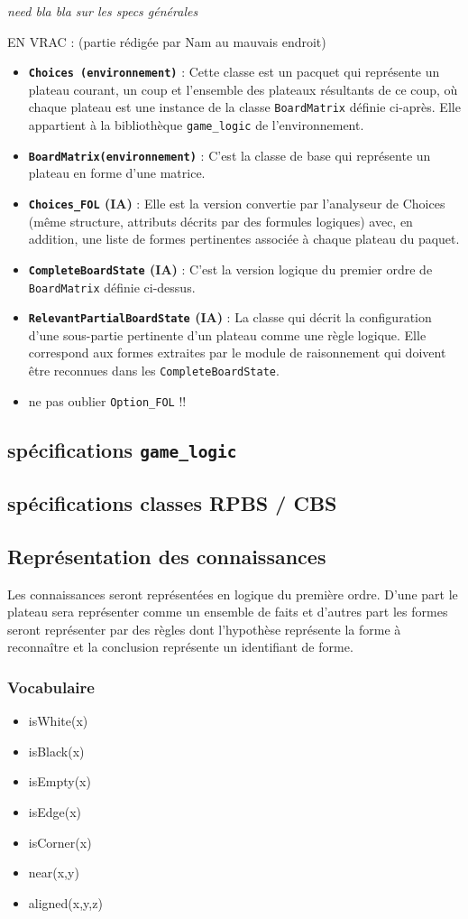 \emph{need bla bla sur les specs générales}

EN VRAC :
(partie rédigée par Nam au mauvais endroit)

\begin{itemize}
  \item \textbf {\texttt{\gls{Choices} (environnement)}} : Cette classe est un pacquet qui représente un plateau courant, un coup et l'ensemble des plateaux résultants de ce coup, où chaque plateau est une instance de la classe \texttt{\gls{BoardMatrix}} définie ci-après. Elle appartient à la bibliothèque \texttt{\gls{game_logic}} de l'environnement.
  \item \textbf {\texttt{\gls{BoardMatrix}(environnement)}} : C'est la classe de base qui représente un plateau en forme d'une matrice. 
  \item \textbf {\texttt{\gls{Choices_FOL}} (IA)} : Elle est la version convertie par l'analyseur de Choices (même structure, attributs décrits par des formules logiques) avec, en addition, une liste de formes pertinentes associée à chaque plateau du paquet.
  \item \textbf {\texttt{\gls{CompleteBoardState}} (IA)} : C'est la version logique du premier ordre de
  \texttt{\gls{BoardMatrix}} définie ci-dessus.
  \item \textbf {\texttt{\gls{RelevantPartialBoardState}} (IA)} : La classe qui décrit la configuration d'une sous-partie pertinente d'un plateau comme une règle logique. Elle correspond aux \og formes \fg{} extraites par le module de raisonnement qui doivent être reconnues dans les \texttt{\gls{CompleteBoardState}}.
  \item ne pas oublier \texttt{\gls{Option_FOL}} !!
\end{itemize}

\subsection{spécifications \texttt{\gls{game_logic}}}
\label{specs_game_logic}
\subsection{spécifications classes RPBS / CBS}
\label{specs_shared_classes}
\subsection{Représentation des connaissances}
	Les connaissances seront représentées en logique du première ordre. D'une part le plateau sera représenter comme un ensemble de faits et d'autres part les \og formes \fg{} seront représenter par des règles dont l'hypothèse représente la forme à reconnaître et la conclusion représente un identifiant de forme.
	
	\subsubsection{Vocabulaire} 
	\begin{itemize}
	\item isWhite(x)
  \item isBlack(x)
  \item isEmpty(x)
  \item isEdge(x)
  \item isCorner(x)
  \item near(x,y)
  \item aligned(x,y,z)
	\end{itemize}

\label{specs_voc_fol}